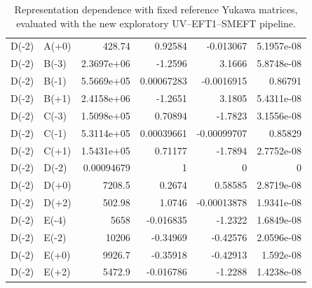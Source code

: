 \begin{table}[htbp]
\begin{tabular}{llrrrr}
D(-2) & A(+0) & 428.74 & 0.92584 & -0.013067 & 5.1957e-08 \\
D(-2) & B(-3) & 2.3697e+06 & -1.2596 & 3.1666 & 5.8748e-08 \\
D(-2) & B(-1) & 5.5669e+05 & 0.00067283 & -0.0016915 & 0.86791 \\
D(-2) & B(+1) & 2.4158e+06 & -1.2651 & 3.1805 & 5.4311e-08 \\
D(-2) & C(-3) & 1.5098e+05 & 0.70894 & -1.7823 & 3.1556e-08 \\
D(-2) & C(-1) & 5.3114e+05 & 0.00039661 & -0.00099707 & 0.85829 \\
D(-2) & C(+1) & 1.5431e+05 & 0.71177 & -1.7894 & 2.7752e-08 \\
D(-2) & D(-2) & 0.00094679 & 1 & 0 & 0 \\
D(-2) & D(+0) & 7208.5 & 0.2674 & 0.58585 & 2.8719e-08 \\
D(-2) & D(+2) & 502.98 & 1.0746 & -0.00013878 & 1.9341e-08 \\
D(-2) & E(-4) & 5658 & -0.016835 & -1.2322 & 1.6849e-08 \\
D(-2) & E(-2) & 10206 & -0.34969 & -0.42576 & 2.0596e-08 \\
D(-2) & E(+0) & 9926.7 & -0.35918 & -0.42913 & 1.592e-08 \\
D(-2) & E(+2) & 5472.9 & -0.016786 & -1.2288 & 1.4238e-08 \\
\hline
\end{tabular}
\caption{Representation dependence with fixed reference Yukawa matrices, evaluated with the new exploratory UV--EFT1--SMEFT pipeline.}
\label{tab:new_generalised_representation}
\end{table}
